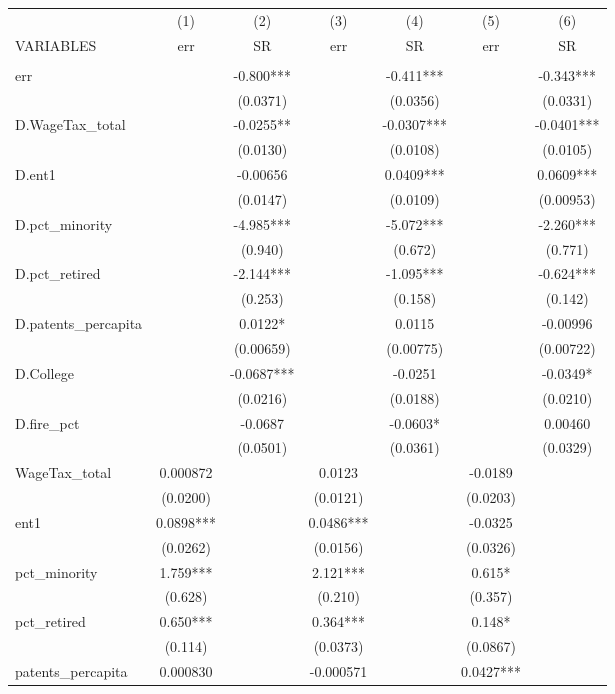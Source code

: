 \begin{tabular}{lcccccc} \hline
 & (1) & (2) & (3) & (4) & (5) & (6) \\
VARIABLES & err & SR & err & SR & err & SR \\ \hline
 &  &  &  &  &  &  \\
err &  & -0.800*** &  & -0.411*** &  & -0.343*** \\
 &  & (0.0371) &  & (0.0356) &  & (0.0331) \\
D.WageTax\_total &  & -0.0255** &  & -0.0307*** &  & -0.0401*** \\
 &  & (0.0130) &  & (0.0108) &  & (0.0105) \\
D.ent1 &  & -0.00656 &  & 0.0409*** &  & 0.0609*** \\
 &  & (0.0147) &  & (0.0109) &  & (0.00953) \\
D.pct\_minority &  & -4.985*** &  & -5.072*** &  & -2.260*** \\
 &  & (0.940) &  & (0.672) &  & (0.771) \\
D.pct\_retired &  & -2.144*** &  & -1.095*** &  & -0.624*** \\
 &  & (0.253) &  & (0.158) &  & (0.142) \\
D.patents\_percapita &  & 0.0122* &  & 0.0115 &  & -0.00996 \\
 &  & (0.00659) &  & (0.00775) &  & (0.00722) \\
D.College &  & -0.0687*** &  & -0.0251 &  & -0.0349* \\
 &  & (0.0216) &  & (0.0188) &  & (0.0210) \\
D.fire\_pct &  & -0.0687 &  & -0.0603* &  & 0.00460 \\
 &  & (0.0501) &  & (0.0361) &  & (0.0329) \\
WageTax\_total & 0.000872 &  & 0.0123 &  & -0.0189 &  \\
 & (0.0200) &  & (0.0121) &  & (0.0203) &  \\
ent1 & 0.0898*** &  & 0.0486*** &  & -0.0325 &  \\
 & (0.0262) &  & (0.0156) &  & (0.0326) &  \\
pct\_minority & 1.759*** &  & 2.121*** &  & 0.615* &  \\
 & (0.628) &  & (0.210) &  & (0.357) &  \\
pct\_retired & 0.650*** &  & 0.364*** &  & 0.148* &  \\
 & (0.114) &  & (0.0373) &  & (0.0867) &  \\
patents\_percapita & 0.000830 &  & -0.000571 &  & 0.0427*** &  \\

\end{tabular}
